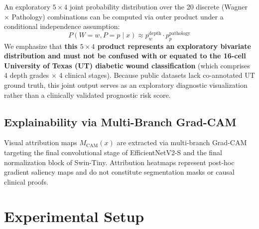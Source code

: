 \documentclass[journal]{IEEEtran}
\begin{document}
An exploratory $5 \times 4$ joint probability distribution over the 20 discrete (Wagner $\times$ Pathology) combinations can be computed via outer product under a conditional independence assumption:
\begin{equation}
    P(W = w, P = p \mid x) \approx p_{w}^{\text{depth}} \cdot p_{p}^{\text{pathology}}
\end{equation}
We emphasize that \textbf{this $5 \times 4$ product represents an exploratory bivariate distribution and must not be confused with or equated to the 16-cell University of Texas (UT) diabetic wound classification} (which comprises 4 depth grades $\times$ 4 clinical stages). Because public datasets lack co-annotated UT ground truth, this joint output serves as an exploratory diagnostic visualization rather than a clinically validated prognostic risk score.

\subsection{Explainability via Multi-Branch Grad-CAM}
Visual attribution maps $M_{\text{CAM}}(x)$ are extracted via multi-branch Grad-CAM \cite{selvaraju2017grad} targeting the final convolutional stage of EfficientNetV2-S and the final normalization block of Swin-Tiny. Attribution heatmaps represent post-hoc gradient saliency maps and do not constitute segmentation masks or causal clinical proofs.

\section{Experimental Setup}
\end{document}

